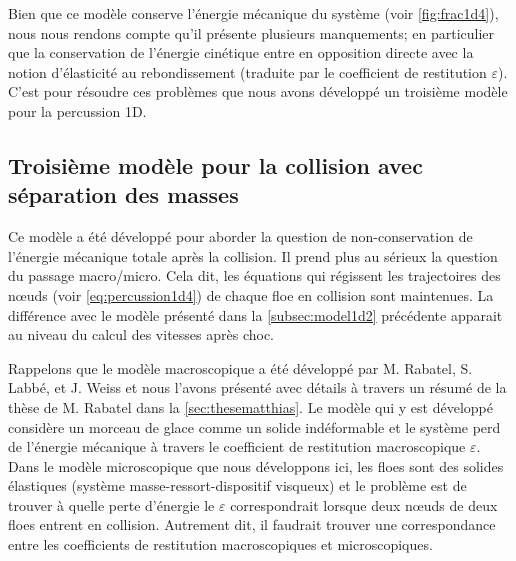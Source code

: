 \noindent Bien que ce modèle conserve l'énergie mécanique du système (voir \cref{fig:frac1d4}), nous nous rendons compte qu'il présente plusieurs manquements; en particulier que la conservation de l'énergie cinétique entre en opposition directe avec la notion d'élasticité au rebondissement (traduite par le coefficient de restitution $\varepsilon$). C'est pour résoudre ces problèmes que nous avons développé un troisième modèle pour la percussion 1D.





\subsection{Troisième modèle pour la collision avec séparation des masses}
\label{subsubsec:troisiemecol}

Ce modèle a été développé pour aborder la question de non-conservation de l'énergie mécanique totale après la collision.
Il prend plus au sérieux la question du passage macro/micro. Cela dit, les équations qui régissent les trajectoires des n\oe{}uds (voir \cref{eq:percussion1d4}) de chaque floe en collision sont maintenues. La différence avec le modèle présenté dans la \cref{subsec:model1d2} précédente  apparait au niveau du calcul des vitesses après choc.

Rappelons que le modèle macroscopique a été développé par M. Rabatel, S. Labbé, et J. Weiss \parencite{rabatel2015dynamics} et nous l'avons présenté avec détails à travers un résumé de la thèse de M. Rabatel \parencite{rabatel2015thesis} dans la \cref{sec:thesematthias}. Le modèle qui y est développé considère un morceau de glace comme un solide indéformable et le système perd de l'énergie mécanique à travers le coefficient de restitution macroscopique $\varepsilon$. Dans le modèle microscopique que nous développons ici, les floes sont des solides élastiques (système masse-ressort-dispositif visqueux) et le problème est de trouver à quelle perte d'énergie le $\varepsilon$ correspondrait lorsque deux n\oe{}uds de deux floes entrent en collision. Autrement dit, il faudrait trouver une correspondance entre les coefficients de restitution macroscopiques et microscopiques.

